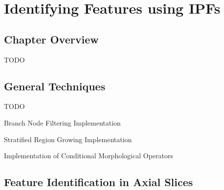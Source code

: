 \chapter{Identifying Features using IPFs}
\label{chap:featureid}

\section{Chapter Overview}

TODO

\section{General Techniques}

TODO

\begin{stulisting}[p]
\caption{Branch Node Filtering Implementation}
\label{code:featureid-techniques-branchnodefiltering}

\end{stulisting}

\begin{stulisting}[p]
\caption{Stratified Region Growing Implementation}
\label{code:featureid-techniques-stratifiedregiongrowing}

\end{stulisting}

\begin{stulisting}[p]
\caption{Implementation of Conditional Morphological Operators}
\label{code:featureid-techniques-conditionalmorphology}

\end{stulisting}

\section{Feature Identification in Axial Slices}

